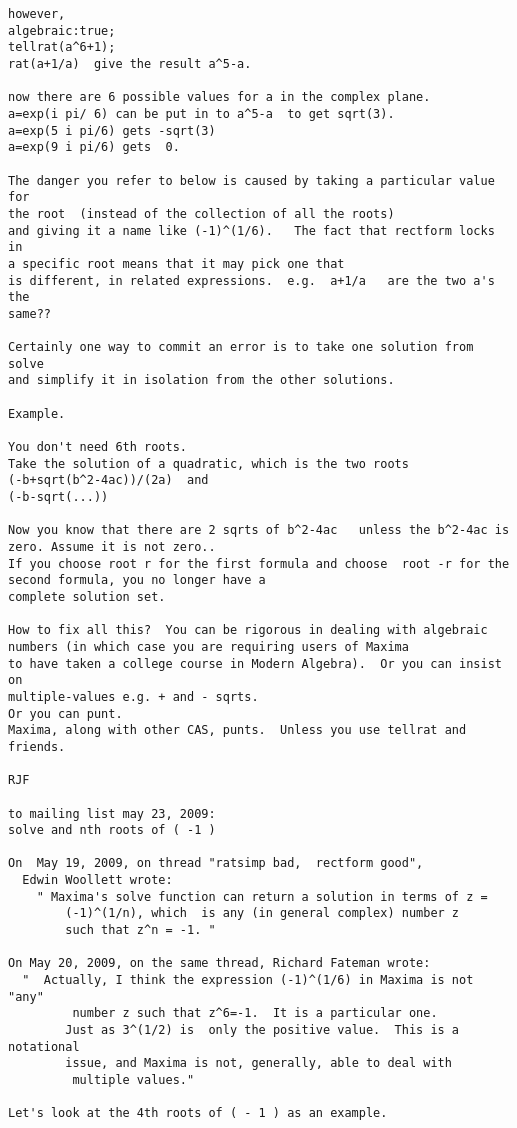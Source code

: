 \documentclass[12pt]{article}
\begin{document}
\begin{verbatim}
however,
algebraic:true;
tellrat(a^6+1);
rat(a+1/a)  give the result a^5-a.

now there are 6 possible values for a in the complex plane.
a=exp(i pi/ 6) can be put in to a^5-a  to get sqrt(3).
a=exp(5 i pi/6) gets -sqrt(3)
a=exp(9 i pi/6) gets  0.

The danger you refer to below is caused by taking a particular value for 
the root  (instead of the collection of all the roots)
and giving it a name like (-1)^(1/6).   The fact that rectform locks in 
a specific root means that it may pick one that
is different, in related expressions.  e.g.  a+1/a   are the two a's the 
same??

Certainly one way to commit an error is to take one solution from solve 
and simplify it in isolation from the other solutions.

Example.

You don't need 6th roots.
Take the solution of a quadratic, which is the two roots
(-b+sqrt(b^2-4ac))/(2a)  and
(-b-sqrt(...))

Now you know that there are 2 sqrts of b^2-4ac   unless the b^2-4ac is 
zero. Assume it is not zero..
If you choose root r for the first formula and choose  root -r for the 
second formula, you no longer have a
complete solution set.

How to fix all this?  You can be rigorous in dealing with algebraic 
numbers (in which case you are requiring users of Maxima
to have taken a college course in Modern Algebra).  Or you can insist on 
multiple-values e.g. + and - sqrts.
Or you can punt.
Maxima, along with other CAS, punts.  Unless you use tellrat and friends.

RJF

to mailing list may 23, 2009:
solve and nth roots of ( -1 )

On  May 19, 2009, on thread "ratsimp bad,  rectform good",
  Edwin Woollett wrote:
    " Maxima's solve function can return a solution in terms of z = 
        (-1)^(1/n), which  is any (in general complex) number z   
        such that z^n = -1. "

On May 20, 2009, on the same thread, Richard Fateman wrote:
  "  Actually, I think the expression (-1)^(1/6) in Maxima is not "any" 
         number z such that z^6=-1.  It is a particular one.
        Just as 3^(1/2) is  only the positive value.  This is a notational 
        issue, and Maxima is not, generally, able to deal with
         multiple values."

Let's look at the 4th roots of ( - 1 ) as an example.


\end{verbatim}
\end{document}
